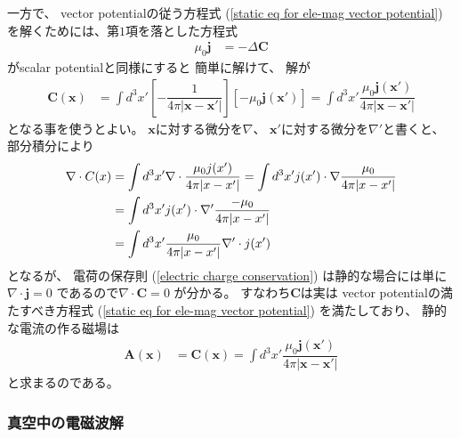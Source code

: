 一方で、
vector potentialの従う方程式
(\ref{static eq for ele-mag vector potential})
を解くためには、第$1$項を落とした方程式
\begin{align}
  \mu_0 \bm{j}
&=
  -
    \Delta
    \bm{C}
\end{align}
がscalar potentialと同様にすると
簡単に解けて、
解が
\begin{align}
  \bm{C} (\bm{x})
&=
  \int d^3 x'
  \left[
    - \dfrac{1}{
      4 \pi |\bm{x} - \bm{x}'|
    }
  \right]
  \left[
    - \mu_0
    \bm{j} (\bm{x}')
  \right]
=
  \int d^3 x'
    \dfrac{
      \mu_0 \bm{j} (\bm{x}')
    }{
      4 \pi
      |\bm{x} - \bm{x}'|
    }
\end{align}
となる事を使うとよい。
$\bm{x}$に対する微分を$\nabla$、
$\bm{x}'$に対する微分を$\nabla'$と書くと、
部分積分により
\begin{align}
  \nabla \cdot C(x)
&=
  \int d^3 x'
    \nabla \cdot
    \dfrac{
      \mu_0 j (x')
    }{
      4 \pi
      |x - x'|
    }
=
  \int d^3 x'
    j (x')
  \cdot
    \nabla
    \dfrac{ \mu_0 }{
      4 \pi
      |x - x'|
    }
\notag\\&
=
  \int d^3 x'
    j (x')
  \cdot
    \nabla'
    \dfrac{ -\mu_0 }{
      4 \pi
      |x - x'|
    }
\notag\\&
=
  \int d^3 x'
    \dfrac{ \mu_0 }{
      4 \pi
      |x - x'|
    }
    \nabla' \cdot j (x')
\end{align}
となるが、
電荷の保存則
(\ref{electric charge conservation})
は静的な場合には単に
$\nabla \cdot \bm{j} = 0$
であるので$\nabla \cdot \bm{C} = 0$
が分かる。
すなわち$\bm{C}$は実は
vector potentialの満たすべき方程式
(\ref{static eq for ele-mag vector potential})
を満たしており、
静的な電流の作る磁場は
\begin{align}
  \bm{A} (\bm{x})
&=
  \bm{C} (\bm{x})
=
  \int d^3 x'
    \dfrac{
      \mu_0 \bm{j} (\bm{x}')
    }{
      4 \pi
      |\bm{x} - \bm{x}'|
    }
\end{align}
と求まるのである。

\subsubsection{真空中の電磁波解}

